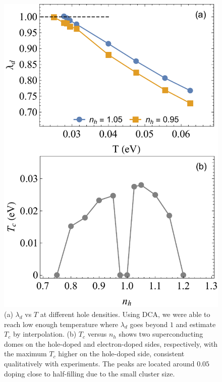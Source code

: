 \documentclass[reprint,nofootinbib,nobibnotes,amsmath,amssymb,aps,prb,floatfix]{revtex4-2}
\begin{document}
\begin{figure}[ht]
\centering
\includegraphics[width=0.83\linewidth]{2by2Tc.pdf}
\caption{ (a) $\lambda_d$ vs $T$ at different hole densities. Using DCA, we were able to reach low enough temperature where $\lambda_d$ goes beyond $1$ and estimate $T_c$ by interpolation. (b) $T_c$ versus $n_h$ shows two superconducting domes on the hole-doped and electron-doped sides, respectively, with the maximum $T_c$ higher on the hole-doped side, consistent qualitatively with experiments. The peaks are located around $0.05$ doping close to half-filling due to the small cluster size. 
}
\label{Tcdopedepend}
\end{figure}
\end{document}
